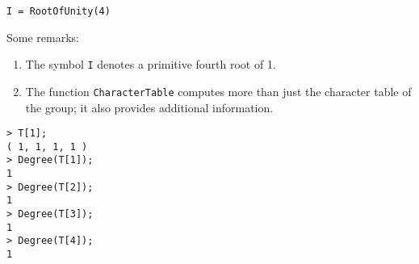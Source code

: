 \begin{example}
\begin{lstlisting}
I = RootOfUnity(4)    
\end{lstlisting}
%
%
%                   
%                   
%
%
%                
%                
Some remarks: 
 \begin{enumerate}
     \item The symbol \lstinline{I} denotes a primitive fourth root of 1.
     \item 	The function \lstinline{CharacterTable} computes more than just the character table of the group; it also provides additional information.
 \end{enumerate}
%
%
\begin{lstlisting}
> T[1];
( 1, 1, 1, 1 )
> Degree(T[1]);
1
> Degree(T[2]);
1
> Degree(T[3]);
1
> Degree(T[4]);
1    
\end{lstlisting}
\end{example}


